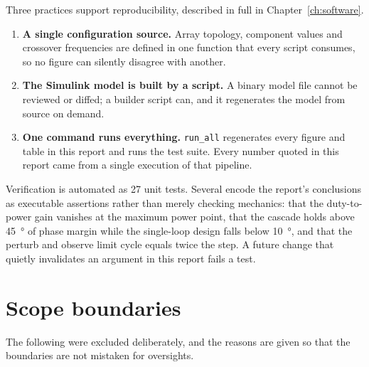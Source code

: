 Three practices support reproducibility, described in full in
Chapter~\ref{ch:software}.

\begin{enumerate}[leftmargin=1.6em]
  \item \textbf{A single configuration source.} Array topology, component values
        and crossover frequencies are defined in one function that every script
        consumes, so no figure can silently disagree with another.
  \item \textbf{The Simulink model is built by a script.} A binary model file
        cannot be reviewed or diffed; a builder script can, and it regenerates
        the model from source on demand.
  \item \textbf{One command runs everything.} \texttt{run\_all} regenerates
        every figure and table in this report and runs the test suite. Every
        number quoted in this report came from a single execution of that
        pipeline.
\end{enumerate}

Verification is automated as 27 unit tests. Several encode the report's
conclusions as executable assertions rather than merely checking mechanics: that
the duty-to-power gain vanishes at the maximum power point, that the cascade
holds above \SI{45}{\degree} of phase margin while the single-loop design falls
below \SI{10}{\degree}, and that the perturb and observe limit cycle equals twice
the step. A future change that quietly invalidates an argument in this report
fails a test.

\section{Scope boundaries}

The following were excluded deliberately, and the reasons are given so that the
boundaries are not mistaken for oversights.

